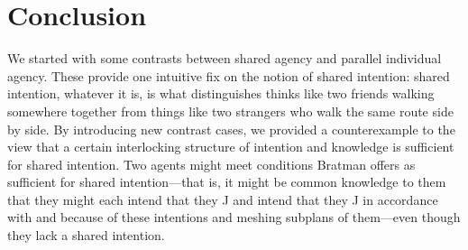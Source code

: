 \documentclass[12pt,\papersize]{extarticle}
\begin{document}
%	
%	
%
%
%
%
%

%
%
%


\section{Conclusion}
We started with some contrasts between shared agency and parallel individual agency.
These provide one intuitive fix on the notion of shared intention: 
 shared intention, whatever it is, is what distinguishes thinks like two friends walking somewhere together from things like two strangers who walk the same route side by side.
By introducing new contrast cases,
we provided a counterexample to the view that a certain interlocking structure of intention and knowledge is sufficient for shared intention. 
Two agents might meet conditions
Bratman offers as sufficient for shared intention---that is, it might be common knowledge to them that they might each intend that they J and intend that they J in accordance with and because of these intentions and meshing subplans of them---even though they lack a shared intention.
\end{document}
